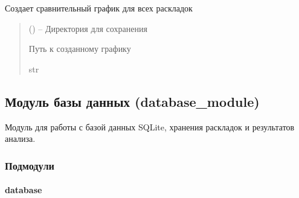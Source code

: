 \documentclass[a4paper,11pt,russian,openany,oneside]{sphinxmanual}
\begin{document}
\begin{savenotes}\begin{fulllineitems}
\label{\detokenize{data_module:data_module.make_export_plot.create_layouts_comparison_chart}}
\pysigstartsignatures
\pysiglinewithargsret
{}
{}
{}
\pysigstopsignatures
\sphinxAtStartPar
Создает сравнительный график для всех раскладок
\begin{quote}\begin{description}
\sphinxAtStartPar
{} () – Директория для сохранения

\sphinxAtStartPar
Путь к созданному графику

\sphinxAtStartPar
str

\end{description}\end{quote}

\end{fulllineitems}\end{savenotes}


\sphinxstepscope


\subsection{Модуль базы данных (database\_module)}
\label{\detokenize{database_module:database-module}}\label{\detokenize{database_module::doc}}
\sphinxAtStartPar
Модуль для работы с базой данных SQLite, хранения раскладок и результатов анализа.

\subsubsection{Подмодули}
\label{\detokenize{database_module:module-database_module}}\label{\detokenize{database_module:id1}}

\paragraph{database}
\label{\detokenize{database_module:module-database_module.database}}\label{\detokenize{database_module:database}}
\end{document}
